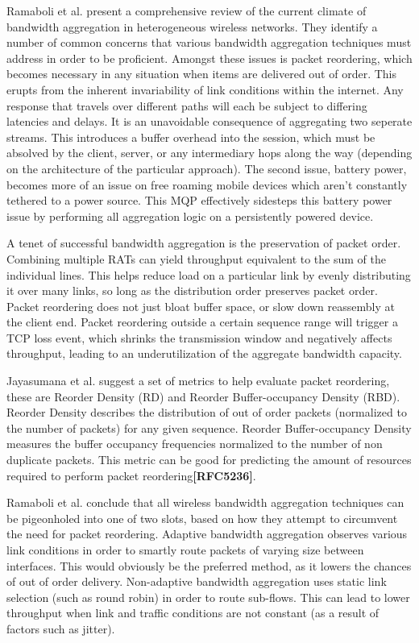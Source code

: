 \documentclass[12pt]{article}
\newcommand{\lcite}[1]
{{\bfseries\color{orange}[#1]}}
\begin{document}
	Ramaboli et al. present a comprehensive review of the current climate of bandwidth aggregation in heterogeneous wireless networks. They identify a number of common concerns that various bandwidth aggregation techniques must address in order to be proficient. Amongst these issues is packet reordering, which becomes necessary in any situation when items are delivered out of order. This erupts from the inherent invariability of link conditions within the internet. Any response that travels over different paths will each be subject to differing latencies and delays. It is an unavoidable consequence of aggregating two seperate streams. This introduces a buffer overhead into the session, which must be absolved by the client, server, or any intermediary hops along the way (depending on the architecture of the particular approach)\cite{Ramaboli20121674}. The second issue, battery power, becomes more of an issue on free roaming mobile devices which aren't constantly tethered to a power source. This MQP effectively sidesteps this battery power issue by performing all aggregation logic on a persistently powered device.

	A tenet of successful bandwidth aggregation is the preservation of packet order. Combining multiple RATs can yield throughput equivalent to the sum of the individual lines. This helps reduce load on a particular link by evenly distributing it over many links, so long as the distribution order preserves packet order. Packet reordering does not just bloat buffer space, or slow down reassembly at the client end. Packet reordering outside a certain sequence range will trigger a TCP loss event, which shrinks the transmission window and negatively affects throughput, leading to an underutilization of the aggregate bandwidth capacity\cite{Ramaboli20121674}.

	Jayasumana et al. suggest a set of metrics to help evaluate packet reordering, these are Reorder Density (RD) and Reorder Buffer-occupancy Density (RBD). Reorder Density describes the distribution of out of order packets (normalized to the number of packets) for any given sequence. Reorder Buffer-occupancy Density measures the buffer occupancy frequencies normalized to the number of non duplicate packets. This metric can be good for predicting the amount of resources required to perform packet reordering\lcite{RFC5236}.

	Ramaboli et al. conclude that all wireless bandwidth aggregation techniques can be pigeonholed into one of two slots, based on how they attempt to circumvent the need for packet reordering. Adaptive bandwidth aggregation observes various link conditions in order to smartly route packets of varying size between interfaces. This would obviously be the preferred method, as it lowers the chances of out of order delivery. Non-adaptive bandwidth aggregation uses static link selection (such as round robin) in order to route sub-flows. This can lead to lower throughput when link and traffic conditions are not constant (as a result of factors such as jitter)\cite{Ramaboli20121674}.
\end{document}
